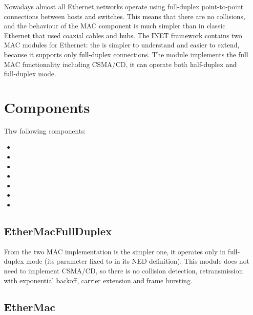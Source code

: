 Nowadays almost all Ethernet networks operate using full-duplex
point-to-point connections between hosts and switches. This means
that there are no collisions, and the behaviour of the MAC component
is much simpler than in classic Ethernet that used coaxial cables and
hubs. The INET framework contains two MAC modules for Ethernet:
the  is simpler to understand and easier to extend,
because it supports only full-duplex connections. The 
module implements the full MAC functionality including CSMA/CD, it
can operate both half-duplex and full-duplex mode.

\section{Components}
\label{sec:ethernet:components}

Thw following components:

\begin{itemize}
  \item {}
  \item {}
  \item {}
  \item {}
  \item {}
  \item {}
  \item {}
\end{itemize}


\subsection{EtherMacFullDuplex}
\label{sec:ethernet:ethermacfullduplex}

From the two MAC implementation  is the simpler one,
it operates only in full-duplex mode (its  parameter fixed to
 in its NED definition). This module does not need to implement
CSMA/CD, so there is no collision detection, retransmission with exponential backoff,
carrier extension and frame bursting.


\subsection{EtherMac}
\label{sec:ethernet:ethermac}

